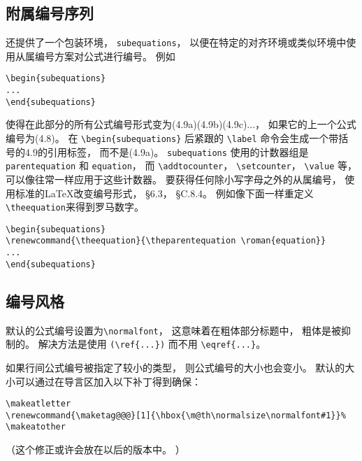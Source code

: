 \subsection{附属编号序列}
还提供了一个包装环境，  \verb|subequations|，  以便在特定的对齐环境或类似环境中使用从属编号方案对公式进行编号。 例如
\begin{verbatim}
\begin{subequations}
...
\end{subequations}
\end{verbatim}
使得在此部分的所有公式编号形式变为(4.9a)(4.9b)(4.9c)...，  如果它的上一个公式编号为(4.8)。 在 \verb|\begin{subequations}| 后紧跟的 \verb|\label| 命令会生成一个带括号的4.9的引用标签，  而不是(4.9a)。 \verb|subequations| 使用的计数器组是 \verb|parentequation| 和  \verb|equation|，  而 \verb|\addtocounter|，  \verb|\setcounter|， \verb|\value| 等，  可以像往常一样应用于这些计数器。 要获得任何除小写字母之外的从属编号，  使用标准的\LaTeX 改变编号形式\cite{3}，  \S6.3，  \S C.8.4。 例如像下面一样重定义\verb|\theequation|来得到罗马数字。
\begin{verbatim}
\begin{subequations}
\renewcommand{\theequation}{\theparentequation \roman{equation}}
...
\end{subequations}
\end{verbatim}

\subsection{编号风格}
默认的公式编号设置为\verb|\normalfont|，  这意味着在粗体部分标题中，  粗体是被抑制的。 解决方法是使用 \verb|(\ref{...})| 而不用 \verb|\eqref{...}|。

如果行间公式编号被指定了较小的类型，  则公式编号的大小也会变小。 默认的大小可以通过在导言区加入以下补丁得到确保：
\begin{verbatim}
\makeatletter
\renewcommand{\maketag@@@}[1]{\hbox{\m@th\normalsize\normalfont#1}}%
\makeatother
\end{verbatim}
（这个修正或许会放在以后的版本中。 ）